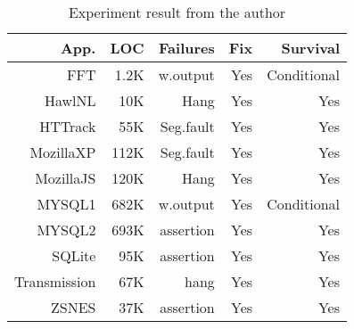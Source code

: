 \begin{table}[htbp]
  \centering
    \begin{tabular}{|r|r|r|r|r|} \hline
    App. & LOC & Failures & Fix & Survival \\ \hline
    FFT & 1.2K & w.output & Yes & Conditional \\
    HawlNL & 10K & Hang & Yes & Yes \\
    HTTrack & 55K & Seg.fault & Yes & Yes \\
    MozillaXP & 112K & Seg.fault & Yes & Yes \\
    MozillaJS & 120K & Hang & Yes & Yes \\
    MYSQL1 & 682K & w.output & Yes & Conditional \\
    MYSQL2 & 693K & assertion & Yes & Yes \\
    SQLite & 95K & assertion & Yes & Yes \\
    Transmission & 67K & hang & Yes & Yes \\
    ZSNES & 37K & assertion & Yes & Yes \\ \hline
    \end{tabular}%
  \caption{Experiment result from the author}
  \label{tab:original}%
\end{table}%
